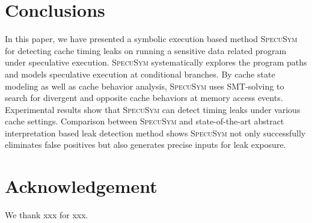 \documentclass[sigconf]{acmart}
\newcommand{\SpecuSym}{\textsc{SpecuSym} }
\begin{document}
\section{Conclusions}
\label{sec:conclusion}


In this paper, we have presented a symbolic execution based method 
\SpecuSym for detecting cache timing leaks on running a sensitive data 
related program under speculative execution. \SpecuSym systematically 
explores the program paths and models speculative execution at conditional 
branches. By cache state modeling as well as cache behavior analysis, 
\SpecuSym uses SMT-solving to search for divergent and opposite cache 
behaviors at memory access events. Experimental results show that 
\SpecuSym can detect timing leaks under various cache settings. Comparison 
between \SpecuSym and state-of-the-art abstract interpretation based 
leak detection method shows \SpecuSym not only successfully eliminates 
false positives but also generates precise inputs for leak exposure.


\section*{Acknowledgement}
We thank xxx for xxx.

\clearpage\newpage


%

\end{document}
